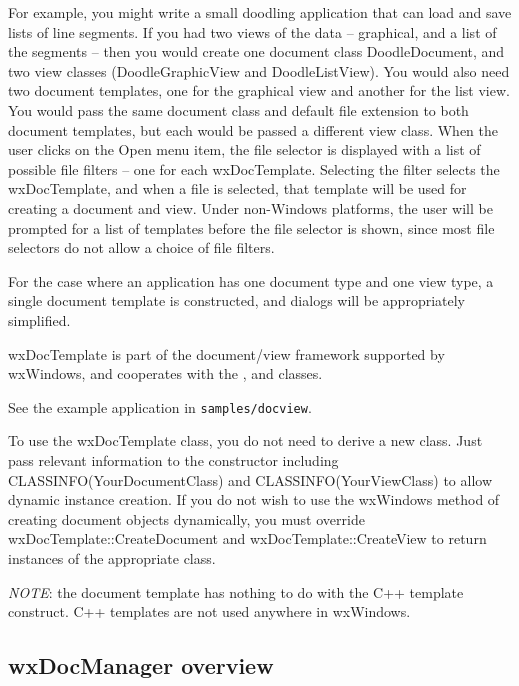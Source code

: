 For example, you might write a small doodling application that can load
and save lists of line segments. If you had two views of the data -- graphical,
and a list of the segments -- then you would create one document class DoodleDocument,
and two view classes (DoodleGraphicView and DoodleListView). You would also
need two document templates, one for the graphical view and another for the
list view. You would pass the same document class and default file extension to both
document templates, but each would be passed a different view class. When
the user clicks on the Open menu item, the file selector is displayed
with a list of possible file filters -- one for each wxDocTemplate. Selecting
the filter selects the wxDocTemplate, and when
a file is selected, that template will be used for creating a document
and view. Under non-Windows platforms, the user will be prompted for
a list of templates before the file selector is shown, since most file selectors
do not allow a choice of file filters.

For the case where an application has one document type and one view type,
a single document template is constructed, and dialogs will be appropriately
simplified.

wxDocTemplate is part of the document/view framework supported by wxWindows,
and cooperates with the , 
and  classes.

See the example application in {\tt samples/docview}.

To use the wxDocTemplate class, you do not need to derive a new class.
Just pass relevant information to the constructor including CLASSINFO(YourDocumentClass) and
CLASSINFO(YourViewClass) to allow dynamic instance creation.
If you do not wish to use the wxWindows method of creating document
objects dynamically, you must override wxDocTemplate::CreateDocument
and wxDocTemplate::CreateView to return instances of the appropriate class.

{\it NOTE}: the document template has nothing to do with the C++ template construct. C++
templates are not used anywhere in wxWindows.

\subsection{wxDocManager overview}\label{wxdocmanageroverview}


